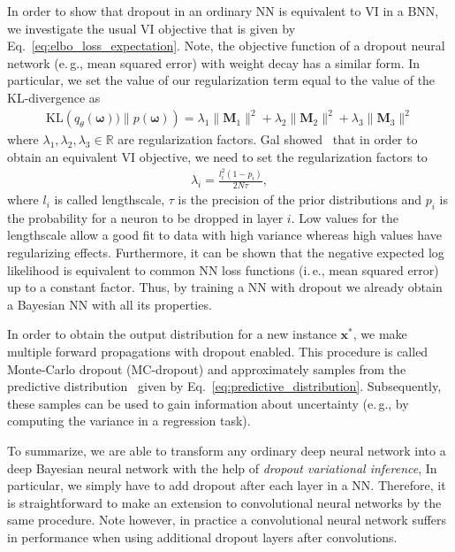 \documentclass[runningheads]{llncs}
\begin{document}
In order to show that dropout in an ordinary NN is equivalent to VI in a BNN, we investigate the usual VI objective that is given by Eq.~\ref{eq:elbo_loss_expectation}.
Note, the objective function of a dropout neural network (e.\,g., mean squared error) with weight decay has a similar form.
In particular, we set the value of our regularization term equal to the value of the KL-divergence as
\begin{align}
\mathrm{KL}\left(q_\theta(\boldsymbol{\omega}))\|p(\boldsymbol{\omega})\right) = \lambda_1 \|\mathbf{M}_1\|^2+ \lambda_2 \|\mathbf{M}_2\|^2 + \lambda_3 \|\mathbf{M}_3\|^2
\end{align}
where $\lambda_1, \lambda_2, \lambda_3 \in \mathbb{R}$ are regularization factors.
Gal showed~\cite{Gal2016Uncertainty} that in order to obtain an equivalent VI objective, we need to set the regularization factors to 
\begin{align}
    \lambda_i = \frac{l_i^2 (1 - p_i)}{2 N \tau},
\end{align}
where $l_i$ is called lengthscale, $\tau$ is the precision of the prior distributions and $p_i$ is the probability for a neuron to be dropped in layer $i$. 
Low values for the lengthscale allow a good fit to data with high variance whereas high values have regularizing effects.
Furthermore, it can be shown that the negative expected log likelihood is equivalent to common NN loss functions (i.\,e., mean squared error) up to a constant factor.
Thus, by training a NN with dropout we already obtain a Bayesian NN with all its properties.

In order to obtain the output distribution for a new instance $\mathbf{x}^*$, we make multiple forward propagations with dropout enabled. 
This procedure is called Monte-Carlo dropout (MC-dropout) and approximately samples from the predictive distribution~\cite{Gal2016Uncertainty} given by Eq.~\ref{eq:predictive_distribution}.
Subsequently, these samples can be used to gain information about uncertainty (e.\,g., by computing the variance in a regression task).

To summarize, we are able to transform any ordinary deep neural network into a deep Bayesian neural network with the help of \textit{dropout variational inference},
In particular, we simply have to add dropout after each layer in a NN.
Therefore, it is straightforward to make an extension to convolutional neural networks by the same procedure.
Note however, in practice a convolutional neural network suffers in performance when using additional dropout layers after convolutions.
\end{document}
